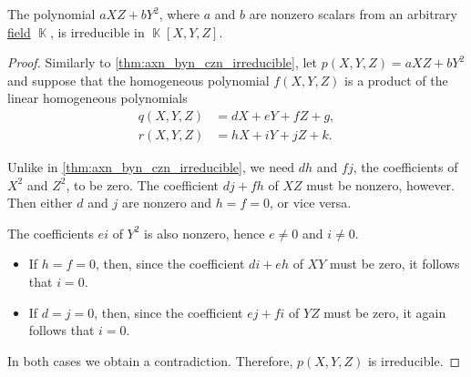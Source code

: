 \begin{proposition}\label{thm:axz_byy_irreducible}
  The polynomial \( a XZ + b Y^2 \), where \( a \) and \( b \) are nonzero scalars from an arbitrary \hyperref[def:field]{field} \( \BbbK \), is irreducible in \( \BbbK[X, Y, Z] \).
\end{proposition}
\begin{proof}
  Similarly to \cref{thm:axn_byn_czn_irreducible}, let \( p(X, Y, Z) = a XZ + b Y^2 \) and suppose that the homogeneous polynomial \( f(X, Y, Z) \) is a product of the linear homogeneous polynomials
  \begin{align*}
    q(X, Y, Z) &= d X + e Y + f Z + g, \\
    r(X, Y, Z) &= h X + i Y + j Z + k.
  \end{align*}

  Unlike in \cref{thm:axn_byn_czn_irreducible}, we need \( dh \) and \( fj \), the coefficients of \( X^2 \) and \( Z^2 \), to be zero. The coefficient \( dj + fh \) of \( XZ \) must be nonzero, however. Then either \( d \) and \( j \) are nonzero and \( h = f = 0 \), or vice versa.

  The coefficients \( ei \) of \( Y^2 \) is also nonzero, hence \( e \neq 0 \) and \( i \neq 0 \).

  \begin{itemize}
    \item If \( h = f = 0 \), then, since the coefficient \( di + eh \) of \( XY \) must be zero, it follows that \( i = 0 \).

    \item If \( d = j = 0 \), then, since the coefficient \( ej + fi \) of \( YZ \) must be zero, it again follows that \( i = 0 \).
  \end{itemize}

  In both cases we obtain a contradiction. Therefore, \( p(X, Y, Z) \) is irreducible.
\end{proof}
